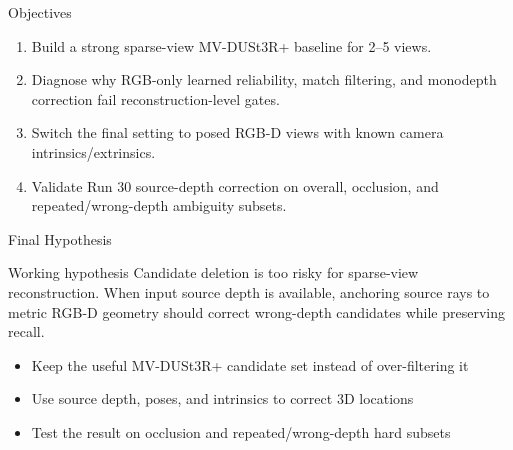 \begin{frame}{Objectives}
  \begin{enumerate}
    \item Build a strong sparse-view MV-DUSt3R+ baseline for 2--5 views.
    \item Diagnose why RGB-only learned reliability, match filtering, and
    monodepth correction fail reconstruction-level gates.
    \item Switch the final setting to posed RGB-D views with known camera
    intrinsics/extrinsics.
    \item Validate Run 30 source-depth correction on overall, occlusion, and
    repeated/wrong-depth ambiguity subsets.
  \end{enumerate}
\end{frame}

\begin{frame}{Final Hypothesis}
  \begin{block}{Working hypothesis}
    Candidate deletion is too risky for sparse-view reconstruction. When input
    source depth is available, anchoring source rays to metric RGB-D geometry
    should correct wrong-depth candidates while preserving recall.
  \end{block}

  \vspace{0.3cm}
  \begin{itemize}
    \item Keep the useful MV-DUSt3R+ candidate set instead of over-filtering it
    \item Use source depth, poses, and intrinsics to correct 3D locations
    \item Test the result on occlusion and repeated/wrong-depth hard subsets
  \end{itemize}
\end{frame}
